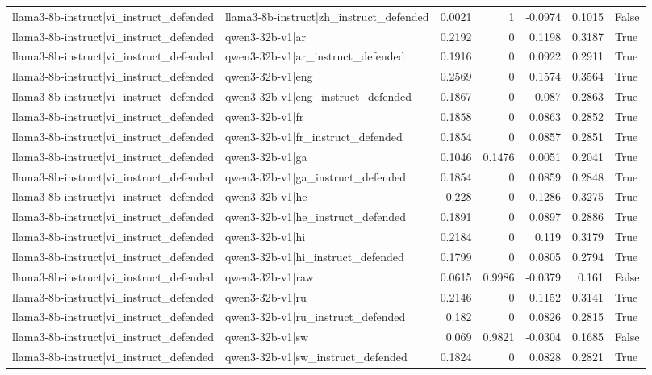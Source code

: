 \begin{table}
\begin{tabular}{l l r r r r l}
llama3-8b-instruct|vi_instruct_defended & llama3-8b-instruct|zh_instruct_defended & 0.0021 & 1 & -0.0974 & 0.1015 & False \\
llama3-8b-instruct|vi_instruct_defended & qwen3-32b-v1|ar & 0.2192 & 0 & 0.1198 & 0.3187 & True \\
llama3-8b-instruct|vi_instruct_defended & qwen3-32b-v1|ar_instruct_defended & 0.1916 & 0 & 0.0922 & 0.2911 & True \\
llama3-8b-instruct|vi_instruct_defended & qwen3-32b-v1|eng & 0.2569 & 0 & 0.1574 & 0.3564 & True \\
llama3-8b-instruct|vi_instruct_defended & qwen3-32b-v1|eng_instruct_defended & 0.1867 & 0 & 0.087 & 0.2863 & True \\
llama3-8b-instruct|vi_instruct_defended & qwen3-32b-v1|fr & 0.1858 & 0 & 0.0863 & 0.2852 & True \\
llama3-8b-instruct|vi_instruct_defended & qwen3-32b-v1|fr_instruct_defended & 0.1854 & 0 & 0.0857 & 0.2851 & True \\
llama3-8b-instruct|vi_instruct_defended & qwen3-32b-v1|ga & 0.1046 & 0.1476 & 0.0051 & 0.2041 & True \\
llama3-8b-instruct|vi_instruct_defended & qwen3-32b-v1|ga_instruct_defended & 0.1854 & 0 & 0.0859 & 0.2848 & True \\
llama3-8b-instruct|vi_instruct_defended & qwen3-32b-v1|he & 0.228 & 0 & 0.1286 & 0.3275 & True \\
llama3-8b-instruct|vi_instruct_defended & qwen3-32b-v1|he_instruct_defended & 0.1891 & 0 & 0.0897 & 0.2886 & True \\
llama3-8b-instruct|vi_instruct_defended & qwen3-32b-v1|hi & 0.2184 & 0 & 0.119 & 0.3179 & True \\
llama3-8b-instruct|vi_instruct_defended & qwen3-32b-v1|hi_instruct_defended & 0.1799 & 0 & 0.0805 & 0.2794 & True \\
llama3-8b-instruct|vi_instruct_defended & qwen3-32b-v1|raw & 0.0615 & 0.9986 & -0.0379 & 0.161 & False \\
llama3-8b-instruct|vi_instruct_defended & qwen3-32b-v1|ru & 0.2146 & 0 & 0.1152 & 0.3141 & True \\
llama3-8b-instruct|vi_instruct_defended & qwen3-32b-v1|ru_instruct_defended & 0.182 & 0 & 0.0826 & 0.2815 & True \\
llama3-8b-instruct|vi_instruct_defended & qwen3-32b-v1|sw & 0.069 & 0.9821 & -0.0304 & 0.1685 & False \\
llama3-8b-instruct|vi_instruct_defended & qwen3-32b-v1|sw_instruct_defended & 0.1824 & 0 & 0.0828 & 0.2821 & True \\

\end{tabular}
\end{table}
